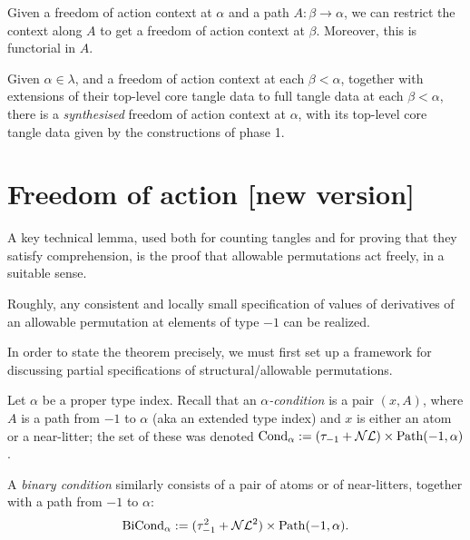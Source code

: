 \begin{definition}
  \label{def:restrict-foa-context}
  Given a freedom of action context at $\alpha$ and a path $A : \beta \to \alpha$, we can restrict the context along $A$ to get a freedom of action context at $\beta$.
  Moreover, this is functorial in $A$.
\end{definition}

\begin{definition}
  \label{def:synthesise-foa-context}
  Given $\alpha \in \lambda$, and a freedom of action context at each $\beta < \alpha$, together with extensions of their top-level core tangle data to full tangle data at each $\beta < \alpha$, there is a \emph{synthesised} freedom of action context at $\alpha$, with its top-level core tangle data given by the constructions of phase 1.
\end{definition}

\section{Freedom of action [new version]}

A key technical lemma, used both for counting tangles and for proving that they satisfy comprehension, is the proof that allowable permutations act freely, in a suitable sense.

Roughly, any consistent and locally small specification of values of derivatives of an allowable permutation at elements of type $-1$ can be realized.

In order to state the theorem precisely, we must first set up a framework for discussing partial specifications of structural/allowable permutations.

\begin{definition}
  \label{def:binary-condition}
  Let $\alpha$ be a proper type index. Recall that an \emph{$\alpha$-condition} is a pair $(x,A)$, where $A$ is a path from $-1$ to $\alpha$ (aka an extended type index) and $x$ is either an atom or a near-litter; the set of these was denoted $\mathrm{Cond}_\alpha := (\tau_{-1} + \mathcal{NL}) \times \mathrm{Path}(-1,\alpha)$.

  A \emph{binary condition} similarly consists of a pair of atoms or of near-litters, together with a path from $-1$ to $\alpha$:
  \[ \mathrm{BiCond}_\alpha := (\tau_{-1}^2 + \mathcal{NL}^2) \times \mathrm{Path}(-1,\alpha).\]
\end{definition}

